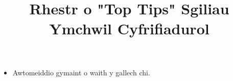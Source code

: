 \documentclass{article}
\title{Rhestr o "Top Tips" Sgiliau Ymchwil Cyfrifiadurol}
\date{}
\begin{document}
\maketitle

\begin{itemize}
  \item Awtomeiddio gymaint o waith y gallech chi.
\end{itemize}
\end{document}
